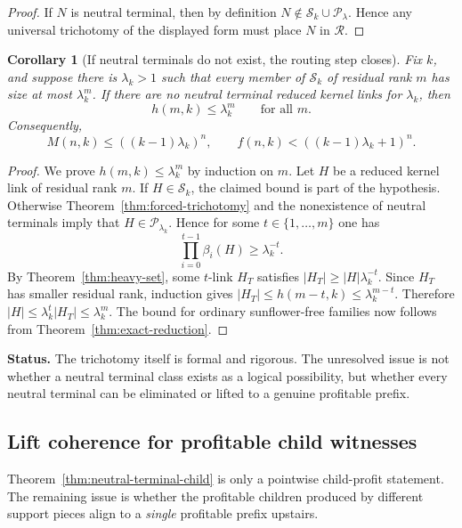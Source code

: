 \documentclass[11pt]{article}
\newtheorem{corollary}[theorem]{Corollary}
\theoremstyle{definition}
\newcommand{\1}{\mathbf{1}}
\newcommand{\status}[1]{\par\smallskip\noindent\textbf{Status.} #1\par\smallskip}
\begin{document}
\begin{proof}
If $N$ is neutral terminal, then by definition $N\notin \mathcal S_k\cup \mathcal P_\lambda$. Hence any universal trichotomy of the displayed form must place $N$ in $\mathcal R$.
\end{proof}

\begin{corollary}[If neutral terminals do not exist, the routing step closes]\label{cor:no-neutral-terminals}
Fix $k$, and suppose there is $\lambda_k>1$ such that every member of $\mathcal S_k$ of residual rank $m$ has size at most $\lambda_k^m$. If there are no neutral terminal reduced kernel links for $\lambda_k$, then
\[
h(m,k)\le \lambda_k^m
\qquad\text{for all }m.
\]
Consequently,
\[
M(n,k)\le ((k-1)\lambda_k)^n,
\qquad
f(n,k)<((k-1)\lambda_k+1)^n.
\]
\end{corollary}

\begin{proof}
We prove $h(m,k)\le \lambda_k^m$ by induction on $m$. Let $H$ be a reduced kernel link of residual rank $m$. If $H\in \mathcal S_k$, the claimed bound is part of the hypothesis. Otherwise Theorem~\ref{thm:forced-trichotomy} and the nonexistence of neutral terminals imply that $H\in \mathcal P_{\lambda_k}$. Hence for some $t\in \{1,\dots,m\}$ one has
\[
\prod_{i=0}^{t-1}\beta_i(H)\ge \lambda_k^{-t}.
\]
By Theorem~\ref{thm:heavy-set}, some $t$-link $H_T$ satisfies $|H_T|\ge |H|\lambda_k^{-t}$. Since $H_T$ has smaller residual rank, induction gives $|H_T|\le h(m-t,k)\le \lambda_k^{m-t}$. Therefore $|H|\le \lambda_k^t|H_T|\le \lambda_k^m$. The bound for ordinary sunflower-free families now follows from Theorem~\ref{thm:exact-reduction}.
\end{proof}

\status{The trichotomy itself is formal and rigorous. The unresolved issue is not whether a neutral terminal class exists as a logical possibility, but whether every neutral terminal can be eliminated or lifted to a genuine profitable prefix.}

\subsection*{Lift coherence for profitable child witnesses}
Theorem~\ref{thm:neutral-terminal-child} is only a pointwise child-profit statement. The remaining issue is whether the profitable children produced by different support pieces align to a \emph{single} profitable prefix upstairs.
\end{document}
